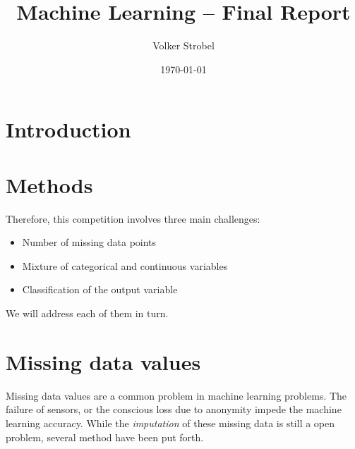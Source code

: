 \documentclass{article}
\title{Machine Learning -- Final Report}
\author{Volker Strobel}
\date{\today}
\begin{document}







\section{Introduction}

\section{Methods}


Therefore, this competition involves three main challenges:
\begin{itemize}
\item Number of missing data points
\item Mixture of categorical and continuous variables
\item Classification of the output variable
\end{itemize}

We will address each of them in turn.

\section{Missing data values}

Missing data values are a common problem in machine learning
problems. The failure of sensors, or the conscious loss  due to
anonymity impede the machine learning accuracy. While the \emph{imputation}
of these missing data is still a open problem, several method have
been put forth. 
\end{document}
